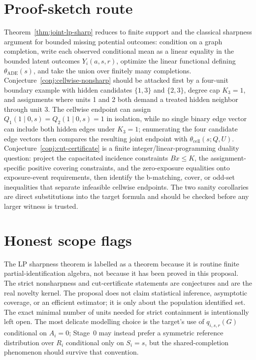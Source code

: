 \documentclass[11pt]{article}
\theoremstyle{definition}
\theoremstyle{plain}
\theoremstyle{remark}
\begin{document}
\section{Proof-sketch route}
Theorem~\ref{thm:joint-lp-sharp} reduces to finite support and the classical sharpness argument for bounded missing potential outcomes: condition on a graph completion, write each observed conditional mean as a linear equality in the bounded latent outcomes \(Y_i(a,s,r)\), optimize the linear functional defining \(\theta_{\mathrm{ADE}}(s)\), and take the union over finitely many completions.  Conjecture~\ref{conj:cellwise-nonsharp} should be attacked first by a four-unit boundary example with hidden candidates \(\{1,3\}\) and \(\{2,3\}\), degree cap \(K_3=1\), and assignments where units 1 and 2 both demand a treated hidden neighbor through unit 3.  The cellwise endpoint can assign \(Q_1(1\mid 0,s)=Q_2(1\mid 0,s)=1\) in isolation, while no single binary edge vector can include both hidden edges under \(K_3=1\); enumerating the four candidate edge vectors then compares the resulting joint endpoint with \(\theta_{\mathrm{cell}}(s;Q,U)\).  Conjecture~\ref{conj:cut-certificate} is a finite integer/linear-programming duality question: project the capacitated incidence constraints \(Bx\le K\), the assignment-specific positive covering constraints, and the zero-exposure equalities onto exposure-event requirements, then identify the b-matching, cover, or odd-set inequalities that separate infeasible cellwise endpoints.  The two sanity corollaries are direct substitutions into the target formula and should be checked before any larger witness is trusted.

\section{Honest scope flags}
The LP sharpness theorem is labelled as a theorem because it is routine finite partial-identification algebra, not because it has been proved in this proposal.  The strict nonsharpness and cut-certificate statements are conjectures and are the real novelty kernel.  The proposal does not claim statistical inference, asymptotic coverage, or an efficient estimator; it is only about the population identified set.  The exact minimal number of units needed for strict containment is intentionally left open.  The most delicate modelling choice is the target's use of \(q_{i,s,r}(G)\) conditional on \(A_i=0\); Stage~0 may instead prefer a symmetric reference distribution over \(R_i\) conditional only on \(S_i=s\), but the shared-completion phenomenon should survive that convention.
\end{document}
